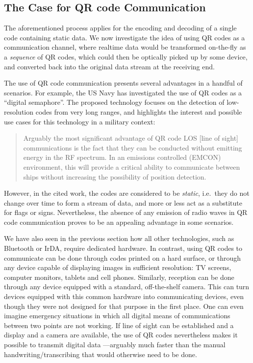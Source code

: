 \subsection{The Case for QR code Communication}

The aforementioned process applies for the encoding and decoding of a single code containing static data. We now investigate the idea of using QR codes as a communication channel, where realtime data would be transformed on-the-fly as a \emph{sequence} of QR codes, which could then be optically picked up by some device, and converted back into the original data stream at the receiving end.

The use of QR code communication presents several advantages in a handful of scenarios. For example, the US Navy has investigated the use of QR codes as a ``digital semaphore''. The proposed technology focuses on the detection of low-resolution codes from very long ranges, and highlights the interest and possible use cases for this technology in a military context:

\begin{quote}
Arguably the most significant advantage of QR code LOS [line of sight] communications is the fact that they can be conducted without emitting energy in the RF spectrum. In an emissions controlled (EMCON) environment, this will provide a critical ability to communicate between ships without increasing the possibility of position detection. \cite[p.\ 46]{richter-msc}
\end{quote}

However, in the cited work, the codes are considered to be \emph{static}, i.e.\ they do not change over time to form a stream of data, and more or less act as a substitute for flags or signs. Nevertheless, the absence of any emission of radio waves in QR code communication proves to be an appealing advantage in some scenarios.

We have also seen in the previous section how all other technologies, such as  Bluetooth or IrDA, require dedicated hardware. In contrast, using QR codes to communicate can be done through codes printed on a hard surface, or through any device capable of displaying images in sufficient resolution: TV screens, computer monitors, tablets and cell phones. Similarly, reception can be done through any device equipped with a standard, off-the-shelf camera. This can turn devices equipped with this common hardware into communicating devices, even though they were not designed for that purpose in the first place. One can even imagine emergency situations in which all digital means of communications between two points are not working. If line of sight can be established and a display and a camera are available, the use of QR codes nevertheless makes it possible to transmit digital data ---arguably much faster than the manual handwriting/transcribing that would otherwise need to be done.

